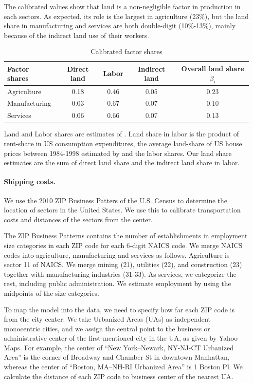 \documentclass[12pt]{article}
\begin{document}
The calibrated values show that land is a non-negligible factor in production in each sectors. As expected, its role is the largest in agriculture (23\%), but the land share in manufacturing and services are both double-digit (10\%-13\%), mainly because of the indirect land use of their workers.


\begin{table}[h!]
\label{tab:Sector_Shares}
\caption{Calibrated factor shares}
\begin{center}
\begin{tabular}{l|ccc|c}
\toprule
Factor shares & Direct land & Labor & Indirect land & Overall land share $\beta_i$ \\
\midrule
Agriculture & 0.18 & 0.46  & 0.05 & 0.23 \\
Manufacturing& 0.03 & 0.67 & 0.07 & 0.10  \\
Services    &  0.06 & 0.66 & 0.07 & 0.13 \\
\bottomrule
\end{tabular}
\end{center}

\noindent \footnotesize{Land and Labor shares are estimates of . Land share in labor is the product of rent-share in US consumption expenditures, the average land-share of US house prices between 1984-1998 estimated by  and the labor shares. Our land share estimates are the sum of direct land share and the indirect land share in labor.}
\end{table}

\paragraph{Shipping costs.}
We use the 2010 ZIP Business Patters of the U.S. Census to determine the location of sectors in the United States. We use this to calibrate transportation costs and distances of the sectors from the center.

The ZIP Business Patterns contains the number of establishments in employment size categories in each ZIP code for each 6-digit NAICS code. We merge NAICS codes into agriculture, manufacturing and services as follows. Agriculture is sector 11 of NAICS. We merge mining (21), utilities (22), and construction (23) together with manufacturing industries (31-33). As services, we categorize the rest, including public administration. We estimate employment by using the midpoints of the size categories.

To map the model into the data, we need to specify how far each ZIP code is from the city center. We take Urbanized Areas (UAs) as independent monocentric cities, and we assign the central point to the business or administrative center of the first-mentioned city in the UA, as given by Yahoo Maps. For example, the center of ``New York–Newark, NY-NJ-CT Urbanized Area'' is the corner of Broadway and Chamber St in downtown Manhattan, whereas the center of ``Boston, MA–NH-RI Urbanized Area'' is 1 Boston Pl. We calculate the distance of each ZIP code to business center of the nearest UA.
\end{document}
